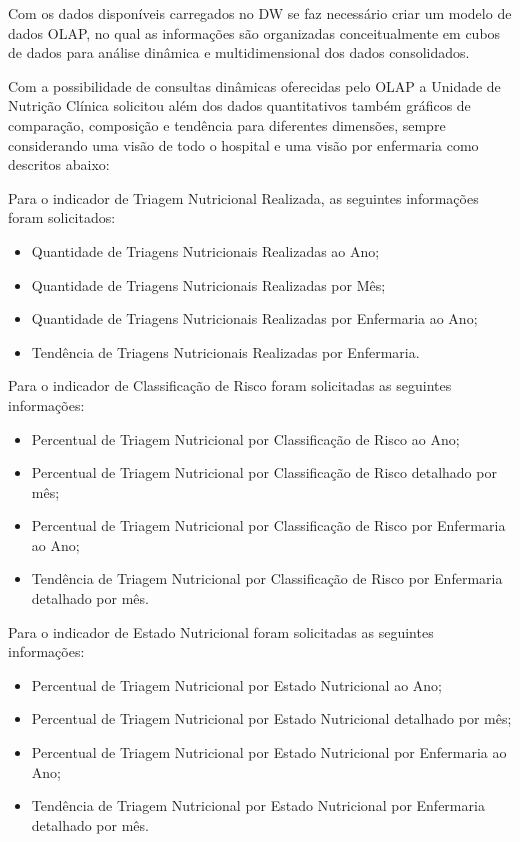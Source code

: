 Com os dados disponíveis carregados no DW se faz necessário criar um modelo de dados OLAP, no qual as informações são organizadas conceitualmente em cubos de dados para análise dinâmica e multidimensional dos dados consolidados.

Com a possibilidade de consultas dinâmicas oferecidas pelo OLAP a Unidade de Nutrição Clínica solicitou além dos dados quantitativos também gráficos de comparação, composição e tendência para diferentes dimensões, sempre considerando uma visão de todo o hospital e uma visão por enfermaria como descritos abaixo: 

Para o indicador de Triagem Nutricional Realizada, as seguintes informações foram solicitados:
\begin{itemize}
    \item Quantidade de Triagens Nutricionais Realizadas ao Ano;
    \item Quantidade de Triagens Nutricionais Realizadas por Mês;
    \item Quantidade de Triagens Nutricionais Realizadas por Enfermaria ao Ano;
    \item Tendência de Triagens Nutricionais Realizadas por Enfermaria.
\end{itemize}

Para o indicador de Classificação de Risco foram solicitadas as seguintes informações:
\begin{itemize}
    \item Percentual de Triagem Nutricional por Classificação de Risco ao Ano;
    \item Percentual de Triagem Nutricional por Classificação de Risco detalhado por mês;
    \item Percentual de Triagem Nutricional por Classificação de Risco por Enfermaria ao Ano;
    \item Tendência de Triagem Nutricional por Classificação de Risco por Enfermaria detalhado por mês.
\end{itemize}

Para o indicador de Estado Nutricional foram solicitadas as seguintes informações:
\begin{itemize}
    \item Percentual de Triagem Nutricional por Estado Nutricional ao Ano;
    \item Percentual de Triagem Nutricional por Estado Nutricional detalhado por mês;
    \item Percentual de Triagem Nutricional por Estado Nutricional por Enfermaria ao Ano;
    \item Tendência de Triagem Nutricional por Estado Nutricional por Enfermaria detalhado por mês.
\end{itemize}

